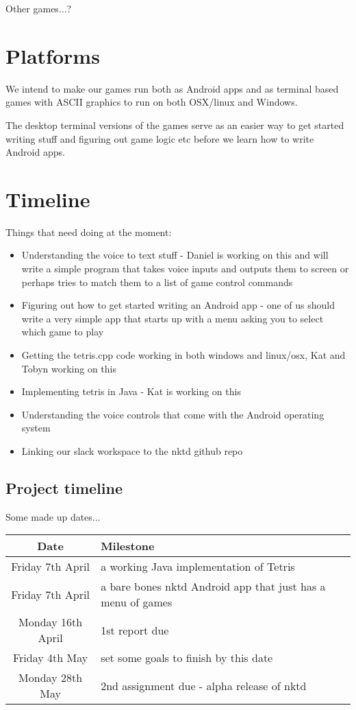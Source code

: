 \documentclass[11pt, oneside]{article}
\begin{document}
Other games...?

\section*{Platforms}

We intend to make our games run both as Android apps and as terminal
based games with ASCII graphics to run on both OSX/linux and Windows.

The desktop terminal versions of the games serve as an easier way to
get started writing stuff and figuring out game logic etc before we
learn how to write Android apps.


\section*{Timeline}

Things that need doing at the moment:
\begin{itemize}
\item Understanding the voice to text stuff - Daniel is working on
  this and will write a simple program that takes voice inputs and
  outputs them to screen or perhaps tries to match them to a list of
  game control commands
\item Figuring out how to get started writing an Android app - one of
  us should write a very simple app that starts up with a menu asking
  you to select which game to play
\item Getting the tetris.cpp code working in both windows and
  linux/osx, Kat and Tobyn working on this
\item Implementing tetris in Java - Kat is working on this
\item Understanding the voice controls that come with the Android
  operating system
\item Linking our slack workspace to the nktd github repo
  
\end{itemize}

\subsection*{Project timeline}

Some made up dates...

\begin{table}[h!]
  \centering
  \begin{tabular}{|c|l|}
    \hline
    Date & Milestone\\
    \hline
    Friday 7th April & a working Java implementation of Tetris \\
    Friday 7th April & a bare bones nktd Android app that just has a menu of games \\ 
    Monday 16th April & 1st report due \\
    Friday 4th May & set some goals to finish by this date \\
    Monday 28th May & 2nd assignment due - alpha release of nktd \\
    \hline
  \end{tabular}
\end{table}


\end{document}
